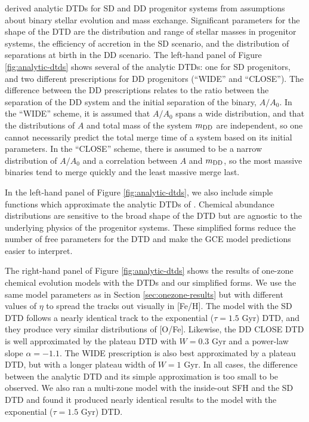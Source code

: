 \documentclass[twocolumn,twocolappendix,linenumbers]{aastex631}
\begin{document}
\citet{Greggio2005-AnalyticalRates} derived analytic DTDs for SD and DD progenitor systems from assumptions about binary stellar evolution and mass exchange. Significant parameters for the shape of the DTD are the distribution and range of stellar masses in progenitor systems, the efficiency of accretion in the SD scenario, and the distribution of separations at birth in the DD scenario. The left-hand panel of Figure \ref{fig:analytic-dtds} shows several of the \citet{Greggio2005-AnalyticalRates} analytic DTDs: one for SD progenitors, and two different prescriptions for DD progenitors (``WIDE'' and ``CLOSE''). The difference between the DD prescriptions relates to the ratio between the separation of the DD system and the initial separation of the binary, $A/A_0$. In the ``WIDE'' scheme, it is assumed that $A/A_0$ spans a wide distribution, and that the distributions of $A$ and total mass of the system $m_{\rm DD}$ are independent, so one cannot necessarily predict the total merge time of a system based on its initial parameters. In the ``CLOSE'' scheme, there is assumed to be a narrow distribution of $A/A_0$ and a correlation between $A$ and $m_{\rm DD}$, so the most massive binaries tend to merge quickly and the least massive merge last.

In the left-hand panel of Figure \ref{fig:analytic-dtds}, we also include simple functions which approximate the analytic DTDs of \citet{Greggio2005-AnalyticalRates}. Chemical abundance distributions are sensitive to the broad shape of the DTD but are agnostic to the underlying physics of the progenitor systems. These simplified forms reduce the number of free parameters for the DTD and make the GCE model predictions easier to interpret.

The right-hand panel of Figure \ref{fig:analytic-dtds} shows the results of one-zone chemical evolution models with the \citet{Greggio2005-AnalyticalRates} DTDs and our simplified forms. We use the same model parameters as in Section \ref{sec:onezone-results} but with different values of $\eta$ to spread the tracks out visually in [Fe/H]. The model with the SD DTD follows a nearly identical track to the exponential ($\tau=1.5$ Gyr) DTD, and they produce very similar distributions of [O/Fe]. Likewise, the DD CLOSE DTD is well approximated by the plateau DTD with $W=0.3$ Gyr and a power-law slope $\alpha=-1.1$. The WIDE prescription is also best approximated by a plateau DTD, but with a longer plateau width of $W=1$ Gyr. In all cases, the difference between the analytic DTD and its simple approximation is too small to be observed. We also ran a multi-zone model with the inside-out SFH and the \citet{Greggio2005-AnalyticalRates} SD DTD and found it produced nearly identical results to the model with the exponential ($\tau=1.5$ Gyr) DTD.
\end{document}
